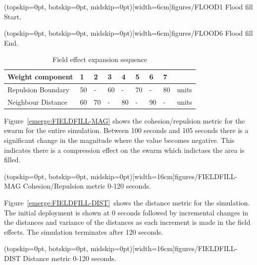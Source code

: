 \documentclass{ieeeaccess}
\begin{document}
\Figure[t!](topskip=0pt, botskip=0pt, midskip=0pt)[width=6cm]{figures/FLOOD1}
{Flood fill Start.\label{emerge:FLOOD1}}

\Figure[t!](topskip=0pt, botskip=0pt, midskip=0pt)[width=6cm]{figures/FLOOD6}
{Flood fill End.\label{emerge:FLOOD6}}

\begin{table}[H]
\begin{center}
\begin{tabular}{| p{1.8cm} | p{0.3cm} | p{0.3cm} | p{0.3cm} | p{0.3cm} | p{0.3cm} | p{0.3cm} | p{0.3cm} | p{0.7cm} |}
\hline
\bf Weight \bf component & \bf 1 & \bf 2 & \bf 3 & \bf 4 & \bf 5 & \bf 6 & \bf 7 & \\ \hline
Repulsion Boundary & 50 & -  & 60 & -  & 70 & -  & 80 & units\\  \hline
Neighbour Distance & 60 & 70 & -  & 80 & -  & 90 & -  & units\\  \hline
\end{tabular}\caption{Field effect expansion sequence} \label{tab:FillSequence}
\end{center}
\end{table}

Figure~\ref{emerge:FIELDFILL-MAG} shows the cohesion/repulsion metric for the swarm for the entire simulation. Between 100 seconds and 105 seconds there is a significant change in the magnitude where the value becomes negative. This indicates there is a compression effect on the swarm which indictaes the area is filled.

\Figure[t!](topskip=0pt, botskip=0pt, midskip=0pt)[width=16cm]{figures/FIELDFILL-MAG}
{Cohesion/Repulsion metric 0-120 seconds.\label{emerge:FIELDFILL-MAG}}


Figure~\ref{emerge:FIELDFILL-DIST}~shows the distance metric for the simulation. The initial deployment is shown at 0 seconds followed by incremental changes in the distances and variance of the distances as each increment is made in the field effects. The simulation terminates after 120 seconds.

\Figure[t!](topskip=0pt, botskip=0pt, midskip=0pt)[width=16cm]{figures/FIELDFILL-DIST}
{Distance metric 0-120 seconds.\label{emerge:FIELDFILL-DIST}}
\end{document}
